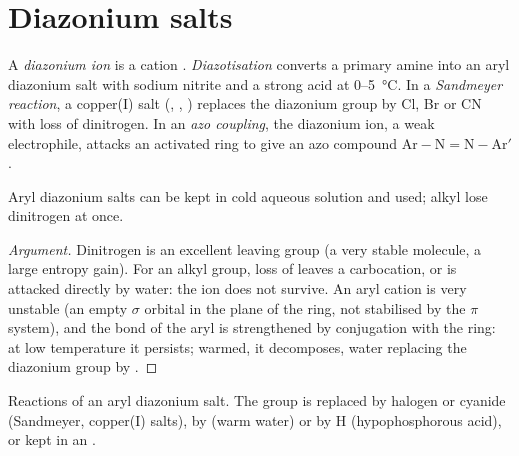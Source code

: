\section{Diazonium salts}

\begin{definition}\label{def:b2:amines:diazonium}
A \emph{diazonium ion} is a cation . \emph{Diazotisation}
converts a primary  amine into an aryl diazonium salt with sodium nitrite and a strong acid at
0--\qty{5}{\degreeCelsius}. In a \emph{Sandmeyer reaction}, a copper(I) salt
(, , ) replaces the diazonium group by Cl, Br or CN with loss of
dinitrogen. In an \emph{azo coupling}, the diazonium ion, a weak electrophile,
attacks an activated  ring to give an azo compound $\mathrm{Ar{-}N{=}N{-}Ar'}$.
\end{definition}

\begin{proposition}\label{prop:b2:amines:diazonium}
Aryl diazonium salts can be kept in cold aqueous solution and used; alkyl  lose
dinitrogen at once.
\end{proposition}

\begin{proof}[Argument]
Dinitrogen is an excellent leaving group (a very stable molecule, a large entropy gain). For an
alkyl group, loss of  leaves a carbocation, or is attacked directly by water: the ion does
not survive. An aryl cation is very unstable (an empty $\sigma$ orbital in the plane of the ring,
not stabilised by the $\pi$ system), and the  bond of the aryl  is
strengthened by conjugation with the ring: at low temperature it persists; warmed, it decomposes,
water replacing the diazonium group by .
\end{proof}

\begin{omfigure}

{\small Reactions of an aryl diazonium salt. The  group is replaced by halogen or
cyanide (Sandmeyer, copper(I) salts), by  (warm water) or by H (hypophosphorous acid), or
kept in an .}
\end{omfigure}

